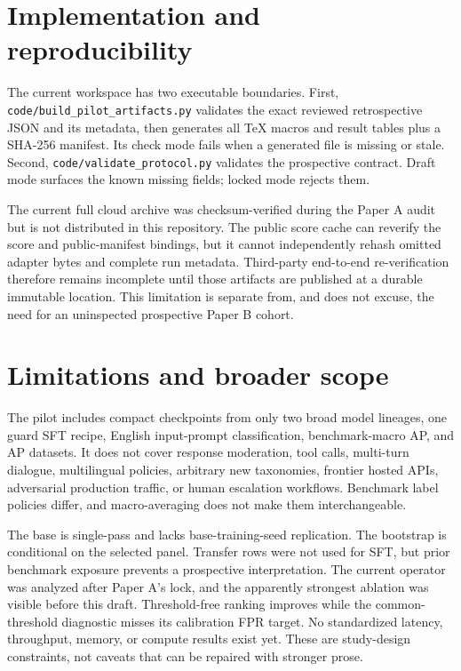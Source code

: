 \documentclass[11pt]{article}
\begin{document}
\section{Implementation and reproducibility}
\label{sec:implementation}

The current workspace has two executable boundaries.  First,
\texttt{code/build\_pilot\_artifacts.py} validates the exact reviewed retrospective JSON and its
metadata, then generates all TeX macros and result tables plus a SHA-256 manifest.  Its check mode
fails when a generated file is missing or stale.  Second,
\texttt{code/validate\_protocol.py} validates the prospective contract.  Draft mode surfaces the
known missing fields; locked mode rejects them.

The current full cloud archive was checksum-verified during the Paper A audit but is not
distributed in this repository.  The public score cache can reverify the score and public-manifest
bindings, but it cannot independently rehash omitted adapter bytes and complete run metadata.
Third-party end-to-end re-verification therefore remains incomplete until those artifacts are
published at a durable immutable location.  This limitation is separate from, and does not excuse,
the need for an uninspected prospective Paper B cohort.

\section{Limitations and broader scope}
\label{sec:limitations}

The pilot includes \PilotNModels{} compact checkpoints from only two broad model lineages, one guard SFT
recipe, English input-prompt classification, benchmark-macro AP, and \PilotNAPDatasets{} AP datasets.  It does
not cover response moderation, tool calls, multi-turn dialogue, multilingual policies, arbitrary
new taxonomies, frontier hosted APIs, adversarial production traffic, or human escalation
workflows.  Benchmark label policies differ, and macro-averaging does not make them interchangeable.

The base is single-pass and lacks base-training-seed replication.  The bootstrap is conditional on
the selected panel.  Transfer rows were not used for SFT, but prior benchmark exposure prevents a
prospective interpretation.  The current operator was analyzed after Paper A's lock, and the
apparently strongest ablation was visible before this draft.  Threshold-free ranking improves
while the common-threshold diagnostic misses its calibration FPR target.  No standardized latency,
throughput, memory, or compute results exist yet.  These are study-design constraints, not caveats
that can be repaired with stronger prose.
\end{document}
